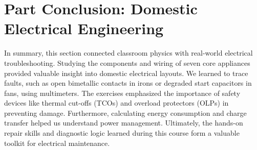 \documentclass[11pt,a4paper]{report}
\begin{document}
\chapter*{Part Conclusion: Domestic Electrical Engineering}
In summary, this section connected classroom physics with real-world electrical troubleshooting. Studying the components and wiring of seven core appliances provided valuable insight into domestic electrical layouts. We learned to trace faults, such as open bimetallic contacts in irons or degraded start capacitors in fans, using multimeters. The exercises emphasized the importance of safety devices like thermal cut-offs (TCOs) and overload protectors (OLPs) in preventing damage. Furthermore, calculating energy consumption and charge transfer helped us understand power management. Ultimately, the hands-on repair skills and diagnostic logic learned during this course form a valuable toolkit for electrical maintenance.
\end{document}
